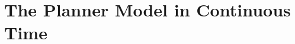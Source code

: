 ﻿\part{The Planner Model in Continuous Time}\label{part:sp}






\begin{appendices}

\end{appendices}

